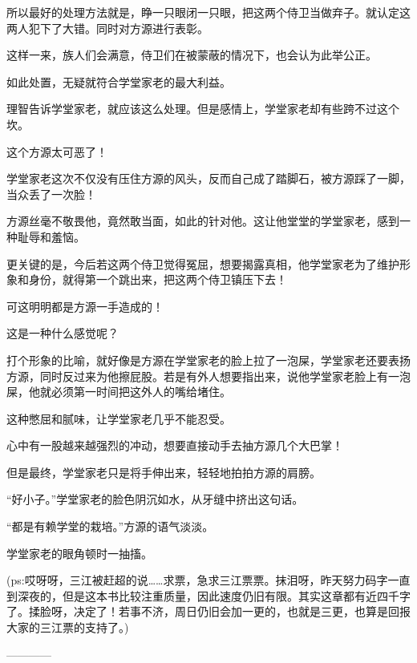 \begin{this_body}
所以最好的处理方法就是，睁一只眼闭一只眼，把这两个侍卫当做弃子。就认定这两人犯下了大错。同时对方源进行表彰。

这样一来，族人们会满意，侍卫们在被蒙蔽的情况下，也会认为此举公正。

如此处置，无疑就符合学堂家老的最大利益。

理智告诉学堂家老，就应该这么处理。但是感情上，学堂家老却有些跨不过这个坎。

这个方源太可恶了！

学堂家老这次不仅没有压住方源的风头，反而自己成了踏脚石，被方源踩了一脚，当众丢了一次脸！

方源丝毫不敬畏他，竟然敢当面，如此的针对他。这让他堂堂的学堂家老，感到一种耻辱和羞恼。

更关键的是，今后若这两个侍卫觉得冤屈，想要揭露真相，他学堂家老为了维护形象和身份，就得第一个跳出来，把这两个侍卫镇压下去！

可这明明都是方源一手造成的！

这是一种什么感觉呢？

打个形象的比喻，就好像是方源在学堂家老的脸上拉了一泡屎，学堂家老还要表扬方源，同时反过来为他擦屁股。若是有外人想要指出来，说他学堂家老脸上有一泡屎，他就必须第一时间把这外人的嘴给堵住。

这种憋屈和腻味，让学堂家老几乎不能忍受。

心中有一股越来越强烈的冲动，想要直接动手去抽方源几个大巴掌！

但是最终，学堂家老只是将手伸出来，轻轻地拍拍方源的肩膀。

“好小子。”学堂家老的脸色阴沉如水，从牙缝中挤出这句话。

“都是有赖学堂的栽培。”方源的语气淡淡。

学堂家老的眼角顿时一抽搐。

(ps:哎呀呀，三江被赶超的说……求票，急求三江票票。抹泪呀，昨天努力码字一直到深夜的，但是这本书比较注重质量，因此速度仍旧有限。其实这章都有近四千字了。揉脸呀，决定了！若事不济，周日仍旧会加一更的，也就是三更，也算是回报大家的三江票的支持了。)

------------

\end{this_body}

